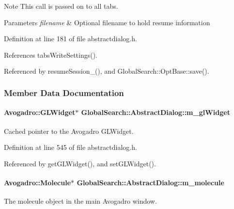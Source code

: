 \begin{DoxyNote}{Note}
This call is passed on to all tabs. 
\end{DoxyNote}

\begin{DoxyParams}{Parameters}
{\em filename} & Optional filename to hold resume information \\
\hline
\end{DoxyParams}


Definition at line 181 of file abstractdialog.\+h.



References tabs\+Write\+Settings().



Referenced by resume\+Session\+\_\+(), and Global\+Search\+::\+Opt\+Base\+::save().



\subsubsection{Member Data Documentation}
\hypertarget{classGlobalSearch_1_1AbstractDialog_a18c6963416c0b49012fa94fd451c96d9}{}
\paragraph[{m\+\_\+gl\+Widget}]{\setlength{\rightskip}{0pt plus 5cm}Avogadro\+::\+G\+L\+Widget$\ast$ Global\+Search\+::\+Abstract\+Dialog\+::m\+\_\+gl\+Widget\hspace{0.3cm}{\ttfamily [protected]}}\label{classGlobalSearch_1_1AbstractDialog_a18c6963416c0b49012fa94fd451c96d9}
Cached pointer to the Avogadro G\+L\+Widget. 

Definition at line 545 of file abstractdialog.\+h.



Referenced by get\+G\+L\+Widget(), and set\+G\+L\+Widget().

\hypertarget{classGlobalSearch_1_1AbstractDialog_a9cf65fe592eebca0ec72a5597edc7faf}{}
\paragraph[{m\+\_\+molecule}]{\setlength{\rightskip}{0pt plus 5cm}Avogadro\+::\+Molecule$\ast$ Global\+Search\+::\+Abstract\+Dialog\+::m\+\_\+molecule\hspace{0.3cm}{\ttfamily [protected]}}\label{classGlobalSearch_1_1AbstractDialog_a9cf65fe592eebca0ec72a5597edc7faf}
The molecule object in the main Avogadro window. 

